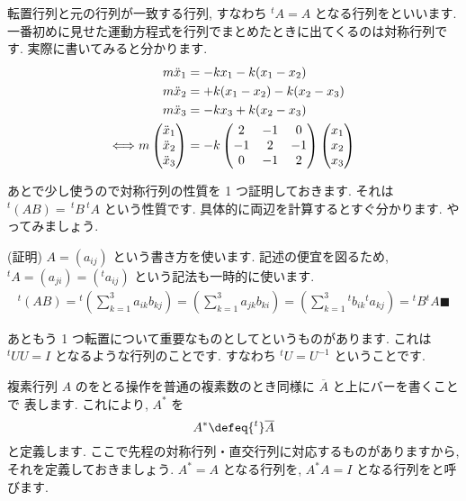\documentclass[openany, a4paper, oneside]{jsbook}
\begin{document}
転置行列と元の行列が一致する行列, すなわち $^{t} A = A$ となる行列をといいます.
一番初めに見せた運動方程式を行列でまとめたときに出てくるのは対称行列です. 実際に書いてみると分かります.
\begin{align}
    m\ddot{x}_{1} &= -kx_1 - k (x_1 - x_2 ) \notag \\
    m\ddot{x}_{2} &= + k (x_1 - x_2 ) - k (x_2 - x_3) \notag \\
    m\ddot{x}_{3} &= -kx_3 +k (x_2 - x_3 )  \notag \\
    \Longleftrightarrow
    m \begin{pmatrix} \ddot{x}_{1} \\ \ddot{x}_{2} \\ \ddot{x}_{3} \end{pmatrix}
    &= -k \begin{pmatrix} 2 & -1 & 0 \\ -1 & 2 & -1 \\ 0 & -1 & 2 \end{pmatrix}
    \begin{pmatrix} x_{1} \\ x_{2} \\ x_{3} \end{pmatrix} \notag
\end{align}

あとで少し使うので対称行列の性質を 1 つ証明しておきます. それは $^{t}(AB) =\, ^{t}B \, ^{t}A$ という性質です.
具体的に両辺を計算するとすぐ分かります. やってみましょう.

(証明) $A=(a_{ij})$ という書き方を使います.
記述の便宜を図るため,  $^{t}A = (a_{j i}) = (^{t}a_{ij})$ という記法も一時的に使います.
\begin{align}
    {^t}(AB)
    = {^t} \left ( \sum_{k=1}^3 a_{i k}b_{k j} \right)
    = \left ( \sum_{k=1}^3 a_{j k}b_{k i} \right)
    = \left ( \sum_{k=1}^3 {^t}b_{i k} {^t}a_{k j} \right)
    = {^t}B {^t}A \blacksquare
\end{align}

あともう 1 つ転置について重要なものとしてというものがあります.
これは $^{t}U U=I$ となるような行列のことです.
すなわち $^{t}U = U^{-1}$ ということです.


複素行列 $A$ のをとる操作を普通の複素数のとき同様に $\overline{A}$ と上にバーを書くことで
表します.
これにより,  $A^{*}$ を
\begin{equation}
    A^{*} \defeq {^t}\overline{A}
\end{equation}
と定義します. ここで先程の対称行列・直交行列に対応するものがありますから, それを定義しておきましょう.
 $A^{*}=A$ となる行列を,
 $A^{*}A = I$ となる行列をと呼びます.
\end{document}
